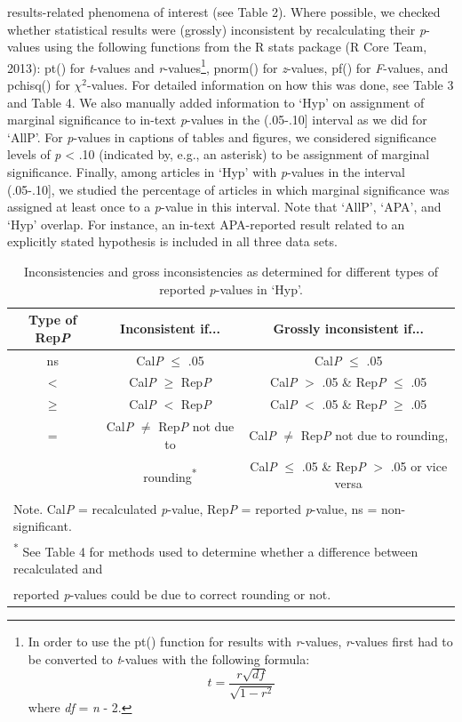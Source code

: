 \documentclass[
  12pt,
]{article}
\begin{document}
results-related phenomena of interest (see Table 2). Where possible, we
checked whether statistical results were (grossly) inconsistent by
recalculating their \emph{p}-values using the following functions from
the R stats package (R Core Team, 2013): pt() for \emph{t}-values and
\emph{r}-values\footnote{In order to use the pt() function for results
  with \emph{r}-values, \emph{r}-values first had to be converted to
  \emph{t}-values with the following formula:
  \[ t = \frac{r\sqrt{df}}{\sqrt{1-r^2}} \] where \emph{df} = \emph{n} -
  2.}, pnorm() for \emph{z}-values, pf() for \emph{F}-values, and
pchisq() for \(\chi^2\)-values. For detailed information on how this was
done, see Table 3 and Table 4. We also manually added information to
`Hyp' on assignment of marginal significance to in-text \emph{p}-values
in the (.05-.10{]} interval as we did for `AllP'. For \emph{p}-values in
captions of tables and figures, we considered significance levels of
\emph{p} \textless{} .10 (indicated by, e.g., an asterisk) to be
assignment of marginal significance. Finally, among articles in `Hyp'
with \emph{p}-values in the interval (.05-.10{]}, we studied the
percentage of articles in which marginal significance was assigned at
least once to a \emph{p}-value in this interval. Note that `AllP',
`APA', and `Hyp' overlap. For instance, an in-text APA-reported result
related to an explicitly stated hypothesis is included in all three data
sets.\\

\begin{table}[H]

\caption{\label{tab:Table 3 definition consistencies and gross inconsistencies Hyp}Inconsistencies and gross inconsistencies as determined for different types of reported \emph{p}-values in  ‘Hyp'.}
\centering
\fontsize{12}{14}\selectfont
\begin{tabular}[t]{ccc}
\toprule
Type of Rep\emph{P} & Inconsistent if... & Grossly inconsistent if...\\
\midrule
ns & Cal\emph{P} $\leq$ .05 & Cal\emph{P} $\leq$ .05\\
$<$ & Cal\emph{P} $\geq$ Rep\emph{P} & Cal\emph{P} $>$ .05 \& Rep\emph{P} $\leq$ .05\\
$\geq$ & Cal\emph{P} $<$ Rep\emph{P} & Cal\emph{P} $<$ .05 \& Rep\emph{P} $\geq$ .05\\
= & Cal\emph{P} $\neq$ Rep\emph{P} not due to & Cal\emph{P} $\neq$ Rep\emph{P} not due to rounding,\\
 & rounding\textsuperscript{*} & Cal\emph{P} $\leq$ .05 \& Rep\emph{P} $>$ .05 or vice versa\\
\bottomrule
\multicolumn{3}{l}{\textsuperscript{} Note. Cal\emph{P} = recalculated \emph{p}-value, Rep\emph{P} = reported \emph{p}-value, ns = non-significant.}\\
\multicolumn{3}{l}{\textsuperscript{*} See Table 4 for methods used to determine whether a difference between recalculated and}\\
\multicolumn{3}{l}{\textsuperscript{} reported \emph{p}-values could be due to correct rounding or not.}\\
\end{tabular}
\end{table}
\pagebreak
\end{document}
